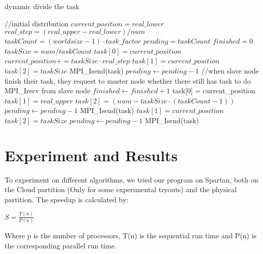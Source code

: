 \documentclass[a4paper]{article}
\begin{document}
\begin{algorithm}[H]
\begin{algorithmic}
\caption{dynamic divide the task}
\STATE //initial distribution
\STATE $current\_position = real\_lower$
\STATE $real\_step = (real\_upper-real\_lower)/num$
\STATE $taskCount = (worldsize - 1)\cdot task\_factor$
\STATE $pending = taskCount$
\STATE $finished = 0$
\STATE $ taskSize = num / taskCount$
\STATE $task[0] = current\_position$
\STATE $current\_position += taskSize \cdot real\_step$
\STATE $task[1] = current\_position$
\STATE $task[2] = taskSize$
\STATE MPI\_Isend(task)
\STATE $pending \gets pending-1$
\ENDFOR
\STATE //when slave node finish their task, they request to master node whether there still has task to do
\STATE MPI\_Irecv from slave node
\STATE $finished \gets finished+1$
\STATE task[0] = current\_position
\STATE $task[1] = real\_upper$
\STATE $task[2] = (num - taskSize \cdot (taskCount-1))$
\STATE $pending \gets pending-1$
\STATE MPI\_Isend(task)
\ELSE
\STATE $task[1] = current\_position$
\STATE $task[2] = taskSize$
\STATE $pending \gets pending-1$
\STATE MPI\_Isend(task)
\ENDIF 
\ENDIF
\ENDWHILE
\end{algorithmic}
\end{algorithm}



\section{Experiment and Results}
To experiment on different algorithms, we tried our program on Spartan, both on the Cloud partition (Only for some experimental tryouts) and the physical partition.
The speedup is calculated by:
\begin{center}
	$S = \frac{T(n)}{P(n)}$
\end{center}
Where p is the number of processors, T(n) is the sequential run time and P(n) is the corresponding parallel run time. 
\end{document}
